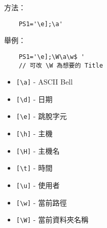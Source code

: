 方法：
\begin{lstlisting}
    PS1='\e];\a'
\end{lstlisting}
舉例：
\begin{lstlisting}
    PS1='\e];\W\a\w$ '
    // 可改 \W 為想要的 Title
\end{lstlisting}
\begin{itemize}
    \item \verb|[\a]| - ASCII Bell
    \item \verb|[\d]| - 日期
    \item \verb|[\e]| - 跳脫字元
    \item \verb|[\h]| - 主機
    \item \verb|[\H]| - 主機名
    \item \verb|[\t]| - 時間  
    \item \verb|[\u]| - 使用者
    \item \verb|[\w]| - 當前路徑
    \item \verb|[\W]| - 當前資料夾名稱
\end{itemize}